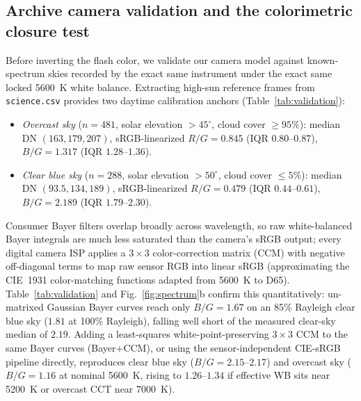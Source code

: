 \documentclass[11pt,a4paper]{article}
\newcommand{\code}[1]{\texttt{\small #1}}
\begin{document}
\subsection{Archive camera validation and the colorimetric closure test}
\label{sec:fit}
Before inverting the flash color, we validate our camera model against
known-spectrum skies recorded by the exact same instrument under the exact
same locked 5600~K white balance. Extracting high-sun reference frames from
\code{science.csv} provides two daytime calibration anchors
(Table~\ref{tab:validation}):
\begin{itemize}\itemsep2pt
  \item \emph{Overcast sky} ($n=481$, solar elevation $>45^\circ$, cloud cover
  $\ge 95\%$): median DN $(163,179,207)$, sRGB-linearized $R/G=0.845$
  (IQR $0.80$--$0.87$), $B/G=1.317$ (IQR $1.28$--$1.36$).
  \item \emph{Clear blue sky} ($n=288$, solar elevation $>50^\circ$, cloud
  cover $\le 5\%$): median DN $(93.5,134,189)$, sRGB-linearized $R/G=0.479$
  (IQR $0.44$--$0.61$), $B/G=2.189$ (IQR $1.79$--$2.30$).
\end{itemize}

Consumer Bayer filters overlap broadly across wavelength, so raw
white-balanced Bayer integrals are much less saturated than the camera's sRGB
output; every digital camera ISP applies a $3\times 3$ color-correction matrix
(CCM) with negative off-diagonal terms to map raw sensor RGB into linear sRGB
(approximating the CIE~1931 color-matching functions adapted from 5600~K to
D65). Table~\ref{tab:validation} and Fig.~\ref{fig:spectrum}b confirm this
quantitatively: un-matrixed Gaussian Bayer curves reach only $B/G=1.67$ on an
85\% Rayleigh clear blue sky ($1.81$ at 100\% Rayleigh), falling well short of
the measured clear-sky median of $2.19$. Adding a least-squares
white-point-preserving $3\times 3$ CCM to the same Bayer curves
(Bayer$+$CCM), or using the sensor-independent CIE-sRGB pipeline directly,
reproduces clear blue sky ($B/G=2.15$--$2.17$) and overcast sky ($B/G=1.16$ at
nominal 5600~K, rising to $1.26$--$1.34$ if effective WB sits near 5200~K or
overcast CCT near 7000~K).
\end{document}

